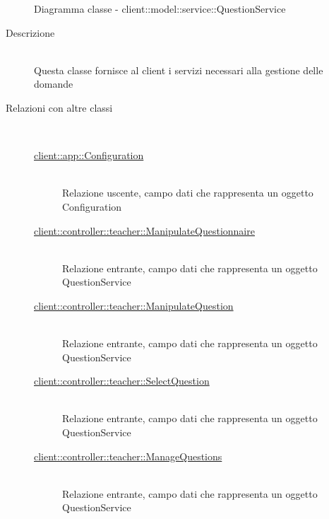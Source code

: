 \vspace{0.5cm}
\hypertarget{client::model::service::QuestionService}{}
\begin{figure}[H]
	\centering
	\caption{Diagramma classe - client::model::service::QuestionService}
\end{figure}\begin{description}
\item[Descrizione] \hfill \\
Questa classe fornisce al client i servizi necessari alla gestione delle domande
\item[Relazioni con altre classi] \hfill \\
\vspace{-7mm}
\begin{description}
	\item[\hyperlink{client::app::Configuration}{client::app::Configuration}] \hfill \\
	Relazione uscente, campo dati che rappresenta un oggetto Configuration
	\item[\hyperlink{client::controller::teacher::ManipulateQuestionnaire}{client::controller::teacher::ManipulateQuestionnaire}] \hfill \\
	Relazione entrante, campo dati che rappresenta un oggetto QuestionService
	\item[\hyperlink{client::controller::teacher::ManipulateQuestion}{client::controller::teacher::ManipulateQuestion}] \hfill \\
	Relazione entrante, campo dati che rappresenta un oggetto QuestionService
	\item[\hyperlink{client::controller::teacher::SelectQuestion}{client::controller::teacher::SelectQuestion}] \hfill \\
	Relazione entrante, campo dati che rappresenta un oggetto QuestionService
	\item[\hyperlink{client::controller::teacher::ManageQuestions}{client::controller::teacher::ManageQuestions}] \hfill \\
	Relazione entrante, campo dati che rappresenta un oggetto QuestionService
\end{description}


\end{description}
